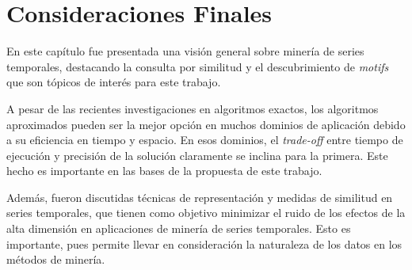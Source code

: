   

\section{Consideraciones Finales}\label{sec:consideraciones-finales}

En este capítulo fue presentada una visión general sobre minería de series \mbox{temporales}, destacando la consulta por similitud y el descubrimiento de \textit{motifs}  que son tópicos de interés para este trabajo.

A pesar de las recientes investigaciones en algoritmos exactos, los algoritmos aproximados pueden ser la mejor opción en muchos dominios de aplicación debido a su eficiencia en tiempo y espacio. En esos dominios, el \textit{trade-off} entre tiempo de ejecución y precisión de la solución claramente se inclina para la primera. Este hecho es importante en las bases de la propuesta de este trabajo.

Además, fueron discutidas técnicas de representación y medidas de similitud en series temporales, que tienen como objetivo minimizar el ruido de los efectos de la alta dimensión en aplicaciones de minería de series temporales. Esto es importante, pues permite llevar en consideración la naturaleza de los datos en los métodos de minería.





